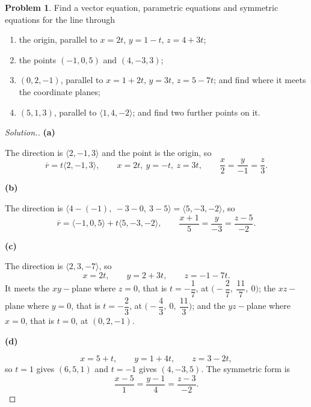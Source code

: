 \documentclass[11pt,a4paper]{article}
\theoremstyle{definition}
\newtheorem{problemx}{Problem}[subsection]
\newenvironment{problem}{\begin{problemx}}{\end{problemx}}
\newenvironment{solution}
  {\renewcommand{\qedsymbol}{}\begin{proof}[\textit{Solution}.]}
  {\end{proof}}
\newcommand{\subhead}[1]{%
  \par\medskip\noindent\textbf{#1}\par\nobreak\smallskip}
\begin{document}
\begin{problem}
Find a vector equation, parametric equations and symmetric equations for the
line through
\begin{enumerate}
\item[(a)] the origin, parallel to $x=2t$, $y=1-t$, $z=4+3t$;
\item[(b)] the points $(-1,0,5)$ and $(4,-3,3)$;
\item[(c)] $(0,2,-1)$, parallel to $x=1+2t$, $y=3t$, $z=5-7t$; and find where it
meets the coordinate planes;
\item[(d)] $(5,1,3)$, parallel to $\langle 1,4,-2\rangle$; and find two further
points on it.
\end{enumerate}
\end{problem}
\begin{solution}
\subhead{(a)}
The direction is $\langle 2,-1,3\rangle$ and the point is the origin, so
$$\overline{r} = t\langle 2,-1,3\rangle,\qquad
x = 2t,\ y = -t,\ z = 3t,\qquad
\frac{x}{2} = \frac{y}{-1} = \frac{z}{3}.$$

\subhead{(b)}
The direction is $\langle 4-(-1),\ -3-0,\ 3-5\rangle = \langle 5,-3,-2\rangle$,
so
$$\overline{r} = \langle -1,0,5\rangle + t\langle 5,-3,-2\rangle,\qquad
\frac{x+1}{5} = \frac{y}{-3} = \frac{z-5}{-2}.$$

\subhead{(c)}
The direction is $\langle 2,3,-7\rangle$, so
$$x = 2t,\qquad y = 2+3t,\qquad z = -1-7t .$$
It meets the $xy-$plane where $z=0$, that is $t = -\dfrac17$, at
$\Big(-\dfrac27,\ \dfrac{11}{7},\ 0\Big)$; the $xz-$plane where $y=0$, that is
$t = -\dfrac23$, at $\Big(-\dfrac43,\ 0,\ \dfrac{11}{3}\Big)$; and the
$yz-$plane where $x=0$, that is $t=0$, at $(0,2,-1)$.

\subhead{(d)}
$$x = 5+t,\qquad y = 1+4t,\qquad z = 3-2t ,$$
so $t=1$ gives $(6,5,1)$ and $t=-1$ gives $(4,-3,5)$. The symmetric form is
$$\frac{x-5}{1} = \frac{y-1}{4} = \frac{z-3}{-2}.$$
\end{solution}
\end{document}
